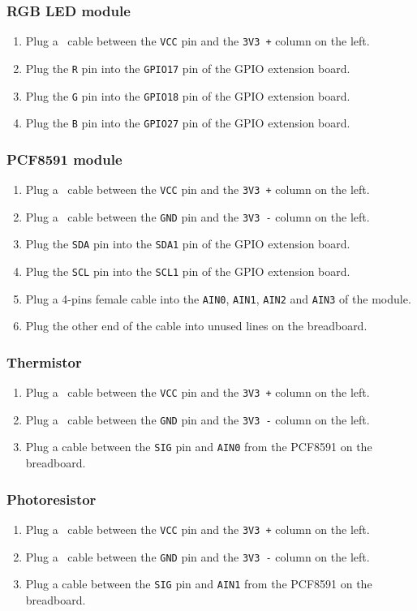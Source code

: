 \documentclass[11pt,a4paper]{article}
\newcommand{\plugmodule}[2]{Plug the \texttt{#1} pin into the \texttt{#2} pin of the GPIO extension board.}
\newcommand{\plugcolumn}[4]{Plug a {#1\def\temp{#1}\ifx\temp\empty\else\ \fi}cable between the \texttt{#2} pin and the \texttt{#3} column on the #4.}
\begin{document}
\subsubsection{RGB LED module}
\begin{enumerate}
  \item	\plugcolumn{}{VCC}{3V3 +}{left}
  \item	\plugmodule{R}{GPIO17}
  \item	\plugmodule{G}{GPIO18}
  \item	\plugmodule{B}{GPIO27}
\end{enumerate}

\subsubsection{PCF8591 module}
\begin{enumerate}
  \item	\plugcolumn{}{VCC}{3V3 +}{left}
  \item \plugcolumn{}{GND}{3V3 -}{left}
  \item	\plugmodule{SDA}{SDA1}
  \item	\plugmodule{SCL}{SCL1}
  \item Plug a 4-pins female cable into the \texttt{AIN0}, \texttt{AIN1}, \texttt{AIN2} and \texttt{AIN3} of the module.
  \item Plug the other end of the cable into unused lines on the breadboard.
\end{enumerate}

\subsubsection{Thermistor}
\begin{enumerate}
  \item	\plugcolumn{}{VCC}{3V3 +}{left}
  \item \plugcolumn{}{GND}{3V3 -}{left}
  \item Plug a cable between the \texttt{SIG} pin and \texttt{AIN0} from the PCF8591 on the breadboard.
\end{enumerate}

\subsubsection{Photoresistor}
\begin{enumerate}
  \item	\plugcolumn{}{VCC}{3V3 +}{left}
  \item \plugcolumn{}{GND}{3V3 -}{left}
  \item	Plug a cable between the \texttt{SIG} pin and \texttt{AIN1} from the PCF8591 on the breadboard.
\end{enumerate}
\end{document}
